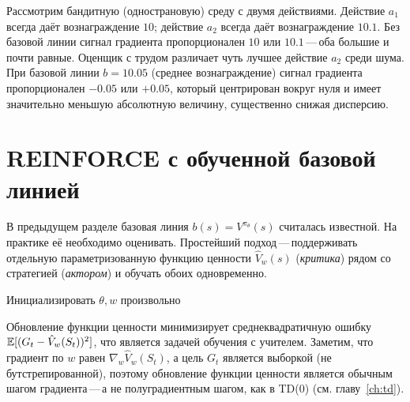 \begin{example}
\label{ex:baseline-variance}
Рассмотрим бандитную (однострановую) среду с двумя действиями. Действие $a_1$ всегда даёт вознаграждение $10$; действие $a_2$ всегда даёт вознаграждение $10.1$. Без базовой линии сигнал градиента пропорционален $10$ или $10.1$\,---\,оба большие и почти равные. Оценщик с трудом различает чуть лучшее действие $a_2$ среди шума. При базовой линии $b = 10.05$ (среднее вознаграждение) сигнал градиента пропорционален $-0.05$ или $+0.05$, который центрирован вокруг нуля и имеет значительно меньшую абсолютную величину, существенно снижая дисперсию.
\end{example}

\section{REINFORCE с обученной базовой линией}
\label{sec:reinforce-baseline}


В предыдущем разделе базовая линия $b(s) = V^{\pi_\theta}(s)$ считалась известной. На практике её необходимо оценивать. Простейший подход\,---\,поддерживать отдельную параметризованную функцию ценности $\hat V_w(s)$ (\emph{критика}) рядом со стратегией (\emph{актором}) и обучать обоих одновременно.

\begin{algorithm}[ht]
\caption{REINFORCE с обученной базовой линией}
\label{alg:reinforce-baseline}
Инициализировать $\theta, w$ произвольно\;
\end{algorithm}

Обновление функции ценности минимизирует среднеквадратичную ошибку $\operatorname{\mathbb{E}}[(G_t - \hat V_w(S_t))^2]$, что является задачей обучения с учителем. Заметим, что градиент по $w$ равен $\nabla_w \hat V_w(S_t)$, а цель $G_t$ является выборкой (не бутстрепированной), поэтому обновление функции ценности является обычным шагом градиента\,---\,а не полуградиентным шагом, как в TD(0) (см. главу~\ref{ch:td}).

